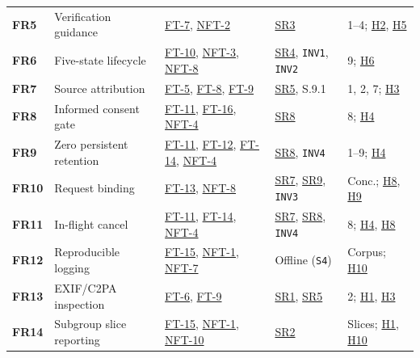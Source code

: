 \documentclass[12pt, titlepage]{article}
\begin{document}
\begin{tabularx}{\textwidth}{P{1.2cm} P{3.9cm} P{3.7cm} P{2.4cm} Y}
\label{req:FR5}\textbf{FR5} & Verification guidance & \hyperref[test:FT-7]{FT-7}, \hyperref[test:NFT-2]{NFT-2} & \hyperref[req:SR3]{SR3} & 1--4; \hyperref[haz:H2]{H2}, \hyperref[haz:H5]{H5}\\
\label{req:FR6}\textbf{FR6} & Five-state lifecycle & \hyperref[test:FT-10]{FT-10}, \hyperref[test:NFT-3]{NFT-3}, \hyperref[test:NFT-8]{NFT-8} & \hyperref[req:SR4]{SR4}, \texttt{INV1}, \texttt{INV2} & 9; \hyperref[haz:H6]{H6}\\
\label{req:FR7}\textbf{FR7} & Source attribution & \hyperref[test:FT-5]{FT-5}, \hyperref[test:FT-8]{FT-8}, \hyperref[test:FT-9]{FT-9} & \hyperref[req:SR5]{SR5}, S.9.1 & 1, 2, 7; \hyperref[haz:H3]{H3}\\
\label{req:FR8}\textbf{FR8} & Informed consent gate & \hyperref[test:FT-11]{FT-11}, \hyperref[test:FT-16]{FT-16}, \hyperref[test:NFT-4]{NFT-4} & \hyperref[req:SR8]{SR8} & 8; \hyperref[haz:H4]{H4}\\
\label{req:FR9}\textbf{FR9} & Zero persistent retention & \hyperref[test:FT-11]{FT-11}, \hyperref[test:FT-12]{FT-12}, \hyperref[test:FT-14]{FT-14}, \hyperref[test:NFT-4]{NFT-4} & \hyperref[req:SR8]{SR8}, \texttt{INV4} & 1--9; \hyperref[haz:H4]{H4}\\
\label{req:FR10}\textbf{FR10} & Request binding & \hyperref[test:FT-13]{FT-13}, \hyperref[test:NFT-8]{NFT-8} & \hyperref[req:SR7]{SR7}, \hyperref[req:SR9]{SR9}, \texttt{INV3} & Conc.; \hyperref[haz:H8]{H8}, \hyperref[haz:H9]{H9}\\
\label{req:FR11}\textbf{FR11} & In-flight cancel & \hyperref[test:FT-11]{FT-11}, \hyperref[test:FT-14]{FT-14}, \hyperref[test:NFT-4]{NFT-4} & \hyperref[req:SR7]{SR7}, \hyperref[req:SR8]{SR8}, \texttt{INV4} & 8; \hyperref[haz:H4]{H4}, \hyperref[haz:H8]{H8}\\
\label{req:FR12}\textbf{FR12} & Reproducible logging & \hyperref[test:FT-15]{FT-15}, \hyperref[test:NFT-1]{NFT-1}, \hyperref[test:NFT-7]{NFT-7} & Offline (\texttt{S4}) & Corpus; \hyperref[haz:H10]{H10}\\
\label{req:FR13}\textbf{FR13} & EXIF/C2PA inspection & \hyperref[test:FT-6]{FT-6}, \hyperref[test:FT-9]{FT-9} & \hyperref[req:SR1]{SR1}, \hyperref[req:SR5]{SR5} & 2; \hyperref[haz:H1]{H1}, \hyperref[haz:H3]{H3}\\
\label{req:FR14}\textbf{FR14} & Subgroup slice reporting & \hyperref[test:FT-15]{FT-15}, \hyperref[test:NFT-1]{NFT-1}, \hyperref[test:NFT-10]{NFT-10} & \hyperref[req:SR2]{SR2} & Slices; \hyperref[haz:H1]{H1}, \hyperref[haz:H10]{H10}\\

\end{tabularx}
\end{document}
